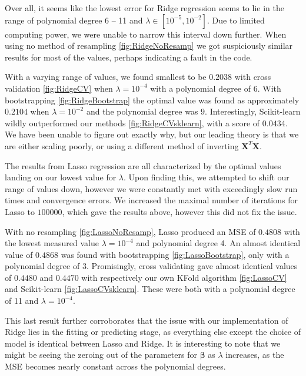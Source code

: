\documentclass{article}
\begin{document}
Over all, it seems like the lowest error for Ridge regression seems to lie in the range of polynomial degree 6 -- 11 and $\lambda \in [10^{-5}, 10^{-2}]$. Due to limited computing power, we were unable to narrow this interval down further. When using no method of resampling \ref{fig:RidgeNoResamp} we got suspiciously similar results for most of the values, perhaps indicating a fault in the code.

With a varying range of values, we found smallest to be $0.2038$ with cross validation \ref{fig:RidgeCV} when $\lambda = 10^{-4}$ with a polynomial degree of $6$. With bootstrapping \ref{fig:RidgeBootstrap} the optimal value was found as approximately $0.2104$ when $\lambda = 10^{-2}$ and the polynomial degree was $9$. Interestingly, Scikit-learn wildly outperformed our methods \ref{fig:RidgeCVsklearn}, with a score of $0.0434$. We have been unable to figure out exactly why, but our leading theory is that we are either scaling poorly, or using a different method of inverting $\textbf{X}^T \textbf{X}$.

The results from Lasso regression are all characterized by the optimal values landing on our lowest value for $\lambda$. Upon finding this, we attempted to shift our range of values down, however we were constantly met with exceedingly slow run times and convergence errors. We increased the maximal number of iterations for Lasso to $100000$, which gave the results above, however this did not fix the issue.

With no resampling \ref{fig:LassoNoResamp}, Lasso produced an MSE of $0.4808$ with the lowest measured value $\lambda = 10^{-4}$ and polynomial degree 4. An almost identical value of $0.4868$ was found with bootstrapping \ref{fig:LassoBootstrap}, only with a polynomial degree of 3. Promisingly, cross validating gave almost identical values of $0.4480$ and $0.4470$ with respectively our own KFold algorithm \ref{fig:LassoCV} and Scikit-learn \ref{fig:LassoCVsklearn}. These were both with a polynomial degree of 11 and $\lambda = 10^{-4}$.

This last result further corroborates that the issue with our implementation of Ridge lies in the fitting or predicting stage, as everything else except the choice of model is identical between Lasso and Ridge. It is interesting to note that we might be seeing the zeroing out of the parameters for $\boldsymbol{\beta}$ as $\lambda$ increases, as the MSE becomes nearly constant across the polynomial degrees.
\end{document}
